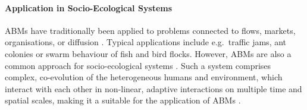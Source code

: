 \paragraph{Application in Socio-Ecological Systems}
ABMs have traditionally been applied to problems connected to flows, markets, organisations, or diffusion \citep{Bonabeau2002}.
Typical applications include e.g.\ traffic jams, ant colonies or swarm behaviour of fish and bird flocks.
However, ABMs are also a common approach for socio-ecological systems \citep{Muller-Hansen2017}.
Such a system comprises complex, co-evolution of the heterogeneous humans and environment, which interact with each other in non-linear, adaptive interactions on multiple time and spatial scales, making it a suitable for the application of ABMs \citep{Bousquet2004}.




